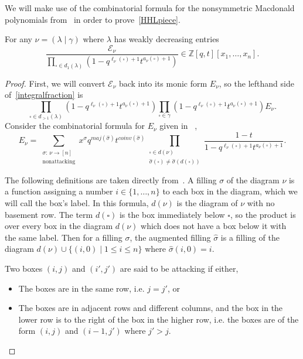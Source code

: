 \documentclass[ALCO]{cedram}
\newcommand{\Z}{\mathbb{Z}}
\newcommand{\nudom}{{( \lambda \mid \gamma )}}
\newcommand{\legnu}{{\ell_\nu(\square)}}
\newcommand{\armtwonu}{{a_\nu(\square)}}
\newcommand{\nonsymmetricprod}{\prod\limits_{\square \in \gamma}}
\newcommand{\dg}{d}
\begin{document}
We will make use of the combinatorial formula for the nonsymmetric Macdonald polynomials from~\cite{MR2405160} in order to prove~\eqref{HHLpiece}.
\begin{lemm}\label{redundancy} For any $\nu = \nudom$ where $\lambda$ has weakly decreasing entries 
\begin{equation}\label{integralfraction} \frac{\mathcal{E}_\nu}{\prod\limits_{ \square \in d_1(\lambda) }(1-q^{\legnu+1}t^{\armtwonu +1})} \in \Z[q,t][x_1, \dotsc, x_n]. \end{equation}
\end{lemm}
\begin{proof}
First, we will convert $\mathcal{E}_\nu$ back into its monic form $E_\nu$, so the lefthand side of~\eqref{integralfraction} is
\[\prod\limits_{\square \in d_{>1}(\lambda) }(1-q^{\legnu+1}t^{\armtwonu + 1}) \nonsymmetricprod(1-q^{\legnu+1}t^{\armtwonu + 1}) E_\nu.\]
Consider the combinatorial formula for $E_\nu$ given in ~\cite{MR2405160},
\[E_\nu = \sum\limits_{\substack{\sigma :\, \nu \to [n] \\ \text{nonattacking}}} x^\sigma q^{maj(\widehat{\sigma})}t^{coinv(\widehat{\sigma})} \prod\limits_{\substack{\square \in  \dg(\nu) \\ \widehat{\sigma}(\square) \neq \widehat{\sigma}(d(\square))}} \frac{1-t}{1-q^{\legnu+1} t^{\armtwonu+1}}.\]

The following definitions are taken directly from~\cite{MR2405160}. A filling $\sigma$ of the diagram $\nu$ is a function assigning a number $i\in \{1, \dotsc, n \} $ to each box in the diagram, which we will call the box's label. In this formula, $\dg(\nu)$ is the diagram of $\nu$ with no basement row. The term $d(\square)$ is the box immediately below $\square$, so the product is over every box in the diagram $\dg(\nu)$ which does not have a box below it with the same label. Then for a filling $\sigma$, the augmented filling $\widehat{\sigma}$ is a filling of the diagram $\dg(\nu) \cup \{ (i,0) \mid 1\leq i \leq n\}$ where $\widehat{\sigma}(i,0)=i$.

Two boxes $(i,j)$ and $(i',j')$ are said to be attacking if either,
\begin{itemize}
    \item The boxes are in the same row, i.e. $j = j'$, or
    \item The boxes are in adjacent rows and different columns, and the box in the lower row is to the right of the box in the higher row, i.e. the boxes are of the form $(i,j)$ and $(i-1,j')$ where $j' > j$.
\end{itemize}


\end{proof}
\end{document}
